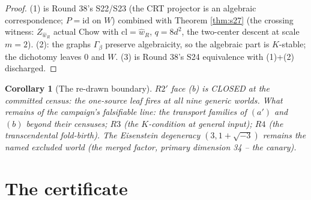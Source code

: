 \documentclass[11pt]{article}
\newtheorem{corollary}[theorem]{Corollary}
\begin{document}
\begin{proof}
(1) is Round 38's S22/S23 (the CRT projector is an algebraic correspondence;
$P = \mathrm{id}$ on $W$) combined with Theorem \ref{thm:s27} (the crossing
witness: $Z_{\hat w_R}$ actual Chow with $\mathrm{cl} = \hat w_R$, $q = 8d^2$,
the two-center descent at scale $m=2$). (2): the graphs $\Gamma_\beta$
preserve algebraicity, so the algebraic part is $K$-stable; the dichotomy
leaves $0$ and $W$. (3) is Round 38's S24 equivalence with (1)+(2)
discharged.
\end{proof}

\begin{corollary}[The re-drawn boundary]
$R2'$ face (b) is CLOSED at the committed census: the one-source leaf fires
at all nine generic worlds. What remains of the campaign's falsifiable line:
the transport families of $(a')$ and $(b)$ beyond their censuses; $R3$ (the
$K$-condition at general input); $R4$ (the transcendental fold-birth). The
Eisenstein degeneracy $(3,1+\sqrt{-3})$ remains the named excluded world
(the merged factor, primary dimension 34 -- the canary).
\end{corollary}

\section*{The certificate}
\end{document}
